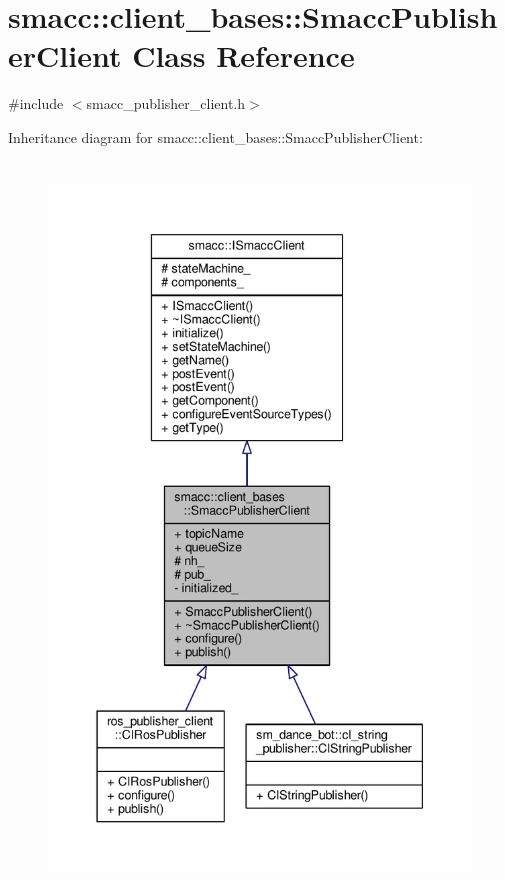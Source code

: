 \hypertarget{classsmacc_1_1client__bases_1_1SmaccPublisherClient}{}\section{smacc\+:\+:client\+\_\+bases\+:\+:Smacc\+Publisher\+Client Class Reference}
\label{classsmacc_1_1client__bases_1_1SmaccPublisherClient}


{\ttfamily \#include $<$smacc\+\_\+publisher\+\_\+client.\+h$>$}



Inheritance diagram for smacc\+:\+:client\+\_\+bases\+:\+:Smacc\+Publisher\+Client\+:\nopagebreak
\begin{figure}[H]
\begin{center}
\leavevmode
\includegraphics[height=550pt]{classsmacc_1_1client__bases_1_1SmaccPublisherClient__inherit__graph}
\end{center}
\end{figure}


